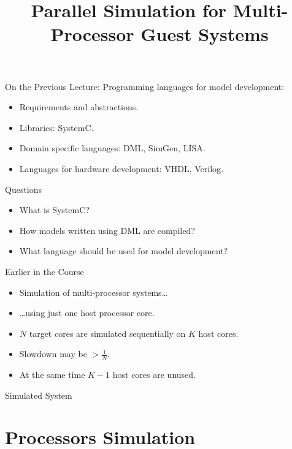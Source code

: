 

\title{Parallel Simulation for Multi-Processor Guest Systems}



\startslides

\begin{frame}{On the Previous Lecture:}
  Programming languages for model development:
  \begin{itemize}
    \item Requirements and abstractions.
    \item Libraries: SystemC.
    \item Domain specific languages: DML, SimGen, LISA.
    \item Languages for hardware development: VHDL, Verilog.
  \end{itemize}
\end{frame}

\begin{frame}{Questions}
  \begin{itemize}
    \item What is SystemC? \pause
    \item How models written using DML are compiled? \pause
    \item What language should be used for model development?
  \end{itemize}
\end{frame}

\begin{frame}{Earlier in the Course}
  \begin{itemize}
   \item Simulation of multi-processor systems\dots\pause
   \item \dots using just one host processor core.
   \vfill
   \item $N$ target cores are simulated sequentially on $K$ host cores.
   \item Slowdown may be $> \frac{1}{N}$.
   \item At the same time $K-1$ host cores are unused.
  \end{itemize}
\end{frame}

\begin{frame}{Simulated System}
  \centering
\end{frame}

\section{Processors Simulation}


